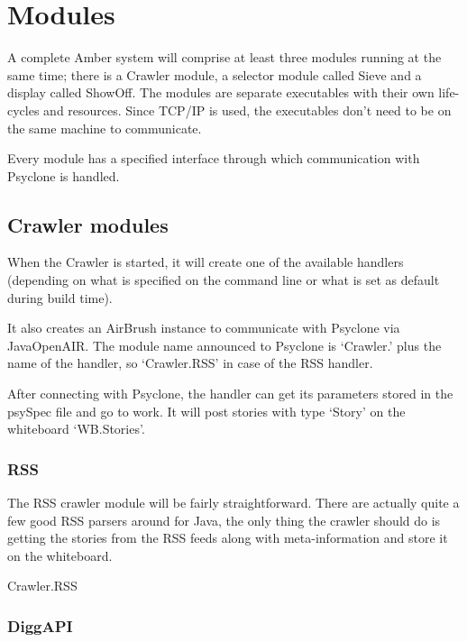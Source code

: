 \section{\label{sct:modules}Modules}

A complete Amber system will comprise at least three modules running at the
same time; there is a Crawler module, a selector module called Sieve and a
display called ShowOff. The modules are separate executables with their own
life-cycles and resources. Since TCP/IP is used, the executables don't need to
be on the same machine to communicate.

Every module has a specified interface through which communication with
Psyclone is handled.

\subsection{Crawler modules}

When the Crawler is started, it will create one of the available handlers
(depending on what is specified on the command line or what is set as default
during build time). 

It also creates an AirBrush instance to communicate with Psyclone via
Java\-Open\-AIR. The module name announced to Psyclone is `Crawler.' plus the
name of the handler, so `Crawler.RSS' in case of the RSS handler.

After connecting with Psyclone, the handler can get its parameters stored in
the psySpec file and go to work. It will post stories with type `Story'  on the
whiteboard `WB.Stories'.

\subsubsection{RSS}

The RSS crawler module will be fairly straightforward. There are actually quite
a few good RSS parsers around for Java, the only thing the crawler should do is
getting the stories from the RSS feeds along with meta-information and store it
on the whiteboard.

\begin{module}{Crawler.RSS}
\end{module}

\subsubsection{DiggAPI}

